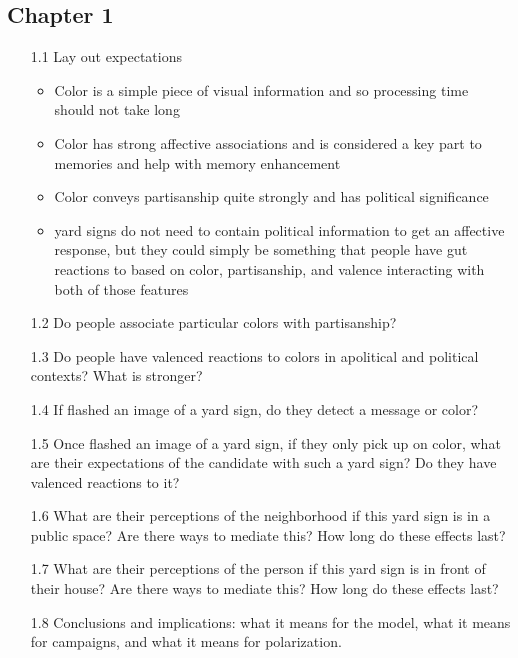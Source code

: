 \documentclass [12pt]{article}
\begin{document}
    \subsection*{Chapter 1}
    \begin{itemize}
        \item[1.1] Lay out expectations
            \begin{itemize}
                \item Color is a simple piece of visual information and so processing time should not take long
                \item Color has strong affective associations and is considered a key part to memories and help with memory enhancement
                \item Color conveys partisanship quite strongly and has political significance
                \item yard signs do not need to contain political information to get an affective response, but they could simply be something that people have gut reactions to based on color, partisanship, and valence interacting with both of those features 
            \end{itemize}
        \item[1.2] Do people associate particular colors with partisanship?
        \item[1.3] Do people have valenced reactions to colors in apolitical and political contexts? What is stronger?
        \item[1.4] If flashed an image of a yard sign, do they detect a message or color?
        \item[1.5] Once flashed an image of a yard sign, if they only pick up on color, what are their expectations of the candidate with such a yard sign? Do they have valenced reactions to it?
        \item[1.6] What are their perceptions of the neighborhood if this yard sign is in a public space? Are there ways to mediate this? How long do these effects last?
        \item[1.7] What are their perceptions of the person if this yard sign is in front of their house? Are there ways to mediate this? How long do these effects last?
        \item[1.8] Conclusions and implications: what it means for the model, what it means for campaigns, and what it means for polarization.
        \end{itemize}
\end{document}
